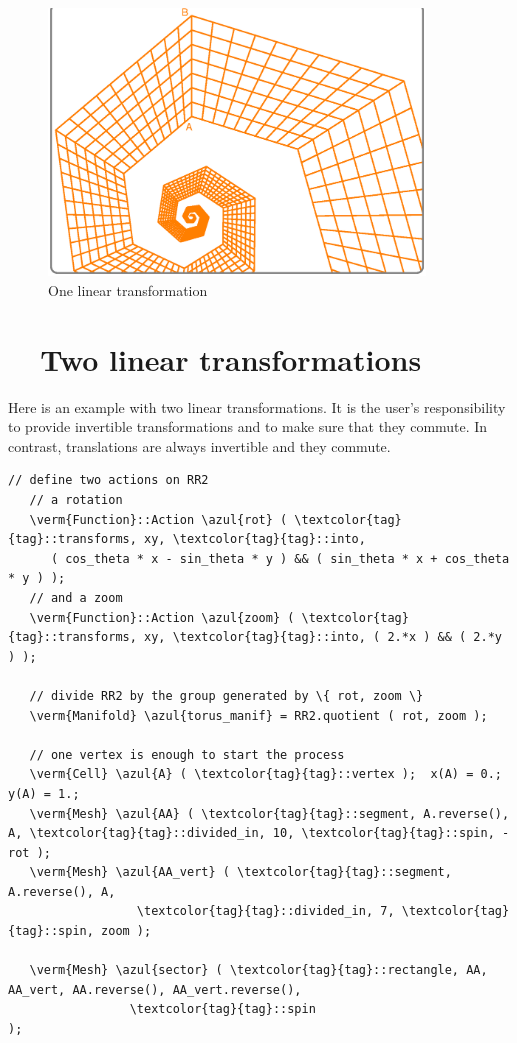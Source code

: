 \begin{figure}[ht] \centering
  \includegraphics[width=100mm]{sector-2.eps}
  \caption{One linear transformation}
  \label{\numb section 7.\numb fig 8}
\end{figure}


\section{~~Two linear transformations}\label{\numb section 7.\numb parag 13}

Here is an example with two linear transformations.
It is the user's responsibility to provide invertible transformations and
to make sure that they commute.
In contrast, translations are always invertible and they commute.

\begin{Verbatim}[commandchars=\\\{\},formatcom=\small\tt,frame=single,
   label=parag-\ref{\numb section 7.\numb parag 13}.cpp,rulecolor=\color{coment},
   baselinestretch=0.94,framesep=2mm                                             ]
   // define two actions on RR2
   // a rotation
   \verm{Function}::Action \azul{rot} ( \textcolor{tag}{tag}::transforms, xy, \textcolor{tag}{tag}::into,
      ( cos_theta * x - sin_theta * y ) && ( sin_theta * x + cos_theta * y ) );
   // and a zoom
   \verm{Function}::Action \azul{zoom} ( \textcolor{tag}{tag}::transforms, xy, \textcolor{tag}{tag}::into, ( 2.*x ) && ( 2.*y ) );

   // divide RR2 by the group generated by \{ rot, zoom \}
   \verm{Manifold} \azul{torus_manif} = RR2.quotient ( rot, zoom );

   // one vertex is enough to start the process
   \verm{Cell} \azul{A} ( \textcolor{tag}{tag}::vertex );  x(A) = 0.;  y(A) = 1.;
   \verm{Mesh} \azul{AA} ( \textcolor{tag}{tag}::segment, A.reverse(), A, \textcolor{tag}{tag}::divided_in, 10, \textcolor{tag}{tag}::spin, -rot );
   \verm{Mesh} \azul{AA_vert} ( \textcolor{tag}{tag}::segment, A.reverse(), A,
                  \textcolor{tag}{tag}::divided_in, 7, \textcolor{tag}{tag}::spin, zoom );

   \verm{Mesh} \azul{sector} ( \textcolor{tag}{tag}::rectangle, AA, AA_vert, AA.reverse(), AA_vert.reverse(),
                 \textcolor{tag}{tag}::spin                                                    );
\end{Verbatim}
  
